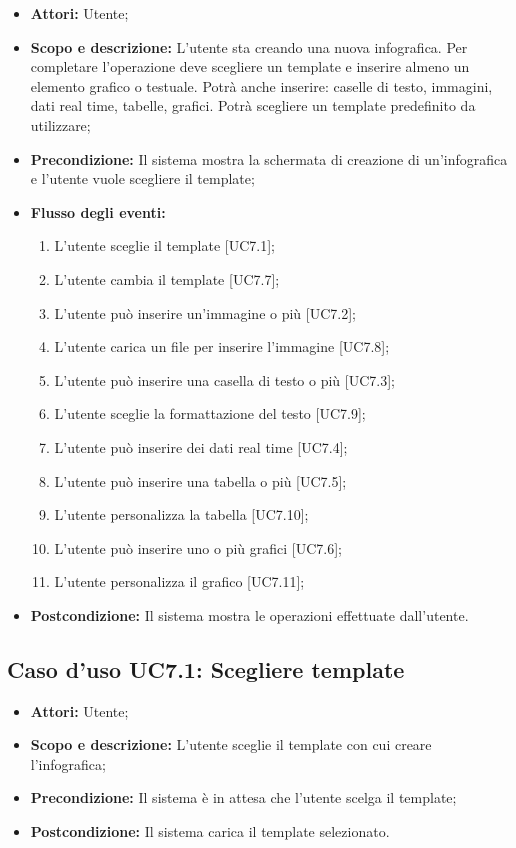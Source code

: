 \begin{itemize}
	\item \textbf{Attori:} Utente;
	\item \textbf{Scopo e descrizione:} L'utente sta creando una nuova infografica. Per completare l'operazione deve scegliere un template e inserire almeno un elemento grafico o testuale. Potrà anche inserire: caselle di testo, immagini, dati \gls{real time}, tabelle, grafici. Potrà scegliere un template predefinito da utilizzare;
	\item \textbf{Precondizione:} Il sistema mostra la schermata di creazione di un'infografica e l'utente vuole scegliere il template;
	\item \textbf{Flusso degli eventi:}
	\begin{enumerate}
		\item L'utente sceglie il template [UC7.1];
		\item L'utente cambia il template [UC7.7];
		\item L'utente può inserire un'immagine o più [UC7.2];
		\item L'utente carica un file per inserire l'immagine [UC7.8];
		\item L'utente può inserire una casella di testo o più [UC7.3];
		\item L'utente sceglie la formattazione del testo [UC7.9];
		\item L'utente può inserire dei dati \gls{real time} [UC7.4];
		\item L'utente può inserire una tabella o più [UC7.5];
		\item L'utente personalizza la tabella [UC7.10];
		\item L'utente può inserire uno o più grafici [UC7.6];
		\item L'utente personalizza il grafico [UC7.11];		
	\end{enumerate}
	\item \textbf{Postcondizione:} Il sistema mostra le operazioni effettuate dall'utente.
\end{itemize}


\subsection{Caso d'uso UC7.1: Scegliere template}
\begin{itemize}
	\item \textbf{Attori:} Utente;
	\item \textbf{Scopo e descrizione:} L'utente sceglie il template con cui creare l'infografica;
	\item \textbf{Precondizione:} Il sistema è in attesa che l'utente scelga il template;
	\item \textbf{Postcondizione:} Il sistema carica il template selezionato.
\end{itemize}


